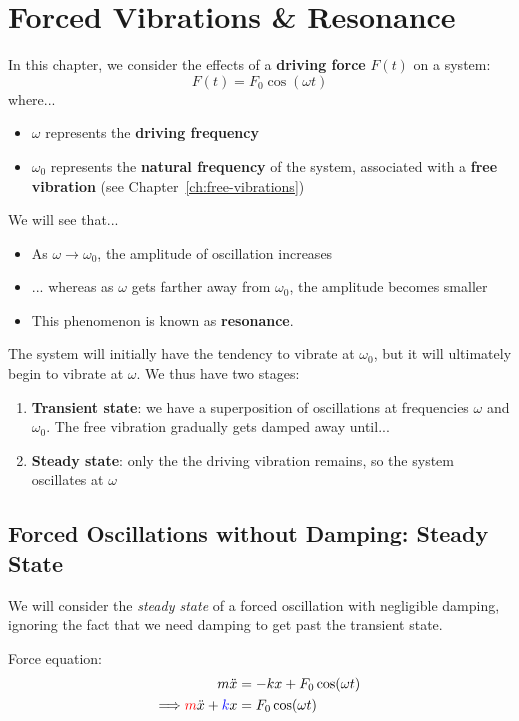 \chapter{Forced Vibrations \& Resonance}


	In this chapter, we consider the effects of a \textbf{driving force} $F(t)$ on a system:
	\[ {F(t) = F_0 \cos(\omega t)} \]
	where...
	\begin{itemize}
		\item $\omega$ represents the \textbf{driving frequency}
		\item $\omega_0$ represents the \textbf{natural frequency} of the system, associated with a \textbf{free vibration} (see Chapter~\ref{ch:free-vibrations})
	\end{itemize}



We will see that...
\begin{itemize}
	\item As $\omega \to \omega_0$, the amplitude of oscillation increases
	\item ... whereas as $\omega$ gets farther away from $\omega_0$, the amplitude becomes smaller
	\item This phenomenon is known as \textbf{resonance}.
\end{itemize}

The system will initially have the tendency to vibrate at $\omega_0$, but it will ultimately begin to vibrate at $\omega$. We thus have two stages:
\begin{enumerate}
	\item \textbf{Transient state}: we have a superposition of oscillations at frequencies $\omega$ and $\omega_0$. The free vibration gradually gets damped away until...
	\item \textbf{Steady state}: only the the driving vibration remains, so the system oscillates at $\omega$
\end{enumerate}

\section{Forced Oscillations without Damping: Steady State}
We will consider the \emph{steady state} of a forced oscillation with negligible damping, ignoring the fact that we need damping to get past the transient state.

Force equation:
\begin{align}
	m\ddot{x} &= -kx + F_0 \cos(\omega t)  \notag \\
	\Longrightarrow
	\textcolor{red}{m}\ddot{x} + \textcolor{blue}{k}x &= F_0 \cos(\omega t)	\label{ch4:eq-no-b}
\end{align}

